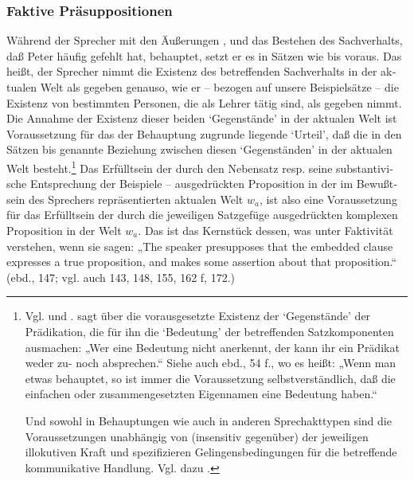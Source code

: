 \documentclass[output=paper]{langscibook}
\begin{document}
\begin{otherlanguage}{german}
\subsubsection{Faktive Präsuppositionen} \label{sec:zi83:3.4.5}

Während der Sprecher mit den Äußerungen ,  und  das Bestehen des Sachverhalts, daß Peter häufig gefehlt hat, behauptet, setzt er es in Sätzen wie  bis  voraus. Das heißt, der Sprecher nimmt die Existenz des be\-treffenden Sachverhalts in der aktualen Welt als gegeben genauso, wie er -- bezogen auf unsere Beispielsätze -- die Existenz von bestimmten Personen, die als Lehrer tätig sind, als gegeben nimmt. Die Annahme der Existenz dieser beiden ‘Gegenstände’ in der aktualen Welt ist Voraussetzung für das der Behauptung zugrunde liegende ‘Urteil’, daß die in den Sätzen  bis  genannte Beziehung zwischen diesen ‘Gegenständen’ in der aktualen Welt besteht.\footnote{Vgl. \citet[128 ff.]{katz1972semantic-theory} und \citet[88]{katz1977propositional-structure-and-illocutionary-force:-a-study-of-the-contribution-of-sentence-meaning-to-speech-acts}. \citet[47]{frege1892uber-sinn-und-bedeutung} sagt über die vor\-aus\-ge\-setz\-te Existenz der ‘Gegenstände’ der Prädikation, die für ihn die ‘Bedeutung’ der betreffenden Satzkomponenten ausmachen: „Wer eine Bedeutung nicht anerkennt, der kann ihr ein Prädikat weder zu- noch absprechen.“ Siehe auch ebd., 54 f., wo es heißt: „Wenn man etwas behauptet, so ist immer die Voraussetzung selbstverständlich, daß die einfachen oder zusammengesetzten Eigennamen eine Bedeutung haben.“ 

\noindent Und sowohl in Behauptungen wie auch in anderen Sprechakttypen sind die Voraussetzungen unabhängig von (insensitiv gegenüber) der jeweiligen illokutiven Kraft und spezifizieren Gelingensbedingungen für die betreffende kommunikative Handlung. Vgl. dazu \citet[97]{fillmore1969verbs-of-judging:-an-exercise-in-semantic-description}.} Das Erfülltsein der durch den Nebensatz resp. seine substantivische Entsprechung der Beispiele -- ausgedrückten Proposition in der im Bewußtsein des Sprechers repräsentierten aktualen Welt $w_{a}$, ist also eine Voraussetzung für das Erfülltsein der durch die jeweiligen Satzgefüge ausgedrückten komplexen Proposition in der Welt $w_{a}$. Das ist das Kernstück dessen, was \citet{kiparsky1970fact} unter Faktivität verstehen, wenn sie sagen: „The speaker presupposes that the embedded clause expresses a true proposition, and makes some assertion about that proposition.“ (ebd., 147; vgl. auch 143, 148, 155, 162 f, 172.)


\end{otherlanguage}
\end{document}
